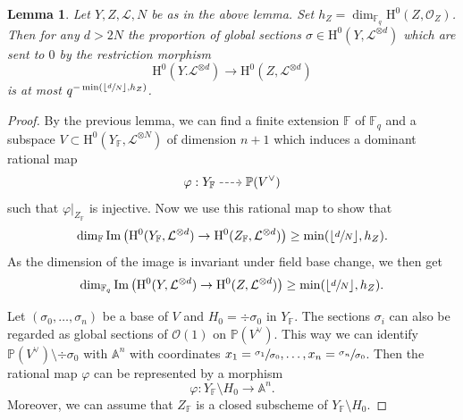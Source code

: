 \documentclass[JEP,XML,SOM,Unicode,published]{cedram}
\newcommand{\dradpl}{{\hspace*{-2.5mm}\begin{tikzcd}[ampersand replacement=\&,column sep = scriptsize]\mbox{}\ar[r,dashed]\&\mbox{}\end{tikzcd}\hspace*{-2mm}}}
\newcommand{\dratst}{{\hspace*{-2.5mm}\begin{tikzcd}[ampersand replacement=\&,column sep = small]\mbox{}\ar[r,dashed]\&\mbox{}\end{tikzcd}\hspace*{-2mm}}}
\let\drascst\dratst
\newcommand{\dra}{\mathchoice{\dradpl}{\dratst}{\drascst}{\drascst}}
\theoremstyle{plain}
\newtheorem{lem}[thm]{Lemma}
\theoremstyle{definition}
\newcommand{\ho}{\mathrm{H}}
\newcommand{\li}{\mathcal{L}}
\newcommand{\A}{\mathbb{A}}
\newcommand{\pr}{\mathbb{P}}
\newcommand{\F}{\mathbb{F}}
\begin{document}
\begin{lem}\label{hi}
Let $Y,Z,\li,N$ be as in the above lemma.
Set $h_Z=\dim_{\F_q}\ho^0(Z, \mathcal{O}_Z)$. Then for any $d>2N$ the proportion of global sections $\sigma\in \ho^0(Y, \li^{\otimes d})$ which are sent to $0$ by the restriction morphism
\[
\ho^0(Y. \li^{\otimes d}) \to \ho^0(Z, \li^{\otimes d})
\]
is at most $q^{-\min(\lfloor\sfrac{d}{N}\rfloor, h_Z)}$.
\end{lem}
\begin{proof}
By the previous lemma, we can find a finite extension $\F$ of $\F_q$ and a subspace $V\subset \ho^0(Y_\F, \li^{\otimes N})$ of dimension $n+1$ which induces a dominant rational map\vspace*{-3pt}
\[
\varphi: Y_{\F}\,\dra \pr(V^{\vee})
\]
such that $\varphi|_{Z_{\F}}$ is injective. Now we use this rational map to show that\vspace*{-3pt}
\[
\dim_\F\mathrm{Im}\left(\ho^0(Y_\F, \li^{\otimes d})\to \ho^0(Z_{\F}, \li^{\otimes d}) \right)\geq \min(\lfloor\sfrac{d}{N}\rfloor, h_Z).
\]
As the dimension of the image is invariant under field base change, we then get\vspace*{-3pt}
\[
\dim_{\F_q}\mathrm{Im}\left(\ho^0(Y, \li^{\otimes d})\to \ho^0(Z, \li^{\otimes d}) \right)\geq \min(\lfloor\sfrac{d}{N}\rfloor, h_Z).
\]

Let $(\sigma_0,\dots, \sigma_n)$ be a base of $V$ and $H_0=\div \sigma_0$ in $Y_{\F}$. The sections $\sigma_i$ can also be regarded as global sections of $\mathcal{O}(1)$ on $\pr(V^{\vee})$. This way we can identify $\pr(V^{\vee})\setminus\div \sigma_0$ with $\A^n$ with coordinates $x_1=\sfrac{\sigma_1}{\sigma_0},\dots, x_n=\sfrac{\sigma_n}{\sigma_0}$. Then the rational map $\varphi$ can be represented by a morphism\vspace*{-3pt}
\[
\varphi: Y_{\F}\setminus H_0 \to \A^n.
\]
Moreover, we can assume that $Z_{\F}$ is a closed subscheme of $Y_{\F}\setminus H_0$.


\end{proof}
\end{document}
